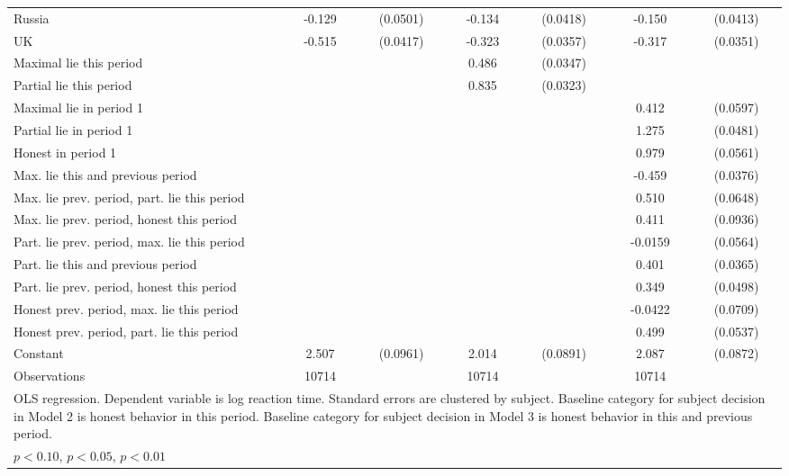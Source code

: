 {\begin{tabular}{l*{3}{cc}}
Russia          &   -0.129\sym{***}& (0.0501)&   -0.134\sym{***}& (0.0418)&   -0.150\sym{***}& (0.0413)\\
UK              &   -0.515\sym{***}& (0.0417)&   -0.323\sym{***}& (0.0357)&   -0.317\sym{***}& (0.0351)\\
Maximal lie this period&                  &         &    0.486\sym{***}& (0.0347)&                  &         \\
Partial lie this period&                  &         &    0.835\sym{***}& (0.0323)&                  &         \\
Maximal lie in period 1&                  &         &                  &         &    0.412\sym{***}& (0.0597)\\
Partial lie in period 1&                  &         &                  &         &    1.275\sym{***}& (0.0481)\\
Honest in period 1&                  &         &                  &         &    0.979\sym{***}& (0.0561)\\
Max. lie this and previous period&                  &         &                  &         &   -0.459\sym{***}& (0.0376)\\
Max. lie prev. period, part. lie this period&                  &         &                  &         &    0.510\sym{***}& (0.0648)\\
Max. lie prev. period, honest this period&                  &         &                  &         &    0.411\sym{***}& (0.0936)\\
Part. lie prev. period, max. lie this period&                  &         &                  &         &  -0.0159         & (0.0564)\\
Part. lie this and previous period&                  &         &                  &         &    0.401\sym{***}& (0.0365)\\
Part. lie prev. period, honest this period&                  &         &                  &         &    0.349\sym{***}& (0.0498)\\
Honest prev. period, max. lie this period&                  &         &                  &         &  -0.0422         & (0.0709)\\
Honest prev. period, part. lie this period&                  &         &                  &         &    0.499\sym{***}& (0.0537)\\
Constant        &    2.507\sym{***}& (0.0961)&    2.014\sym{***}& (0.0891)&    2.087\sym{***}& (0.0872)\\
\hline
Observations    &    10714         &         &    10714         &         &    10714         &         \\
\hline\hline
\multicolumn{7}{l}{\footnotesize OLS regression. Dependent variable is log reaction time. Standard errors are clustered by subject. Baseline category for subject decision in Model 2 is honest behavior in this period. Baseline category for subject decision in Model 3 is honest behavior in this and previous period.}\\
\multicolumn{7}{l}{\footnotesize \sym{*} \(p<0.10\), \sym{**} \(p<0.05\), \sym{***} \(p<0.01\)}\\
\end{tabular}
}
